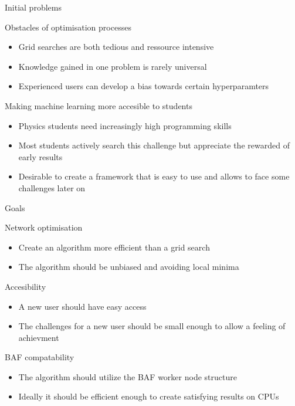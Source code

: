 \begin{frame}{Initial problems}
    \begin{block}{Obstacles of optimisation processes}
        \begin{itemize}
            \item Grid searches are both tedious and ressource intensive
            \item Knowledge gained in one problem is rarely universal
            \item Experienced users can develop a bias towards certain hyperparamters
        \end{itemize}
    \end{block}
    \begin{block}{Making machine learning more accesible to students}
        \begin{itemize}
            \item Physics students need increasingly high programming skills
            \item Most students actively search this challenge but appreciate the rewarded of early results
            \item Desirable to create a framework that is easy to use and allows to face some challenges later on
        \end{itemize}
    \end{block}
\end{frame}

\begin{frame}{Goals}
    \begin{block}{Network optimisation}
        \begin{itemize}
            \item Create an algorithm more efficient than a grid search
            \item The algorithm should be unbiased and avoiding local minima
        \end{itemize}
    \end{block}
    \begin{block}{Accesibility}
        \begin{itemize}
            \item A new user should have easy access
            \item The challenges for a new user should be small enough to allow a feeling of achievment
        \end{itemize}
    \end{block}
    \begin{block}{BAF compatability}
        \begin{itemize}
            \item The algorithm should utilize the BAF worker node structure
            \item Ideally it should be efficient enough to create satisfying results on CPUs
        \end{itemize}
    \end{block}
\end{frame}

